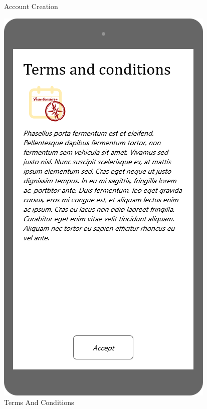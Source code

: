 \documentclass{article}
\begin{document}
\begin{figure}[H]
  \caption{Account Creation}\label{fig:MU1}
\endminipage\hfill
{}
  \includegraphics[width=\linewidth]{02-Terms_and_conditions.png}
  \caption{Terms And Conditions}\label{fig:MU2}
\endminipage\hfill
{}

\end{figure}
\end{document}

